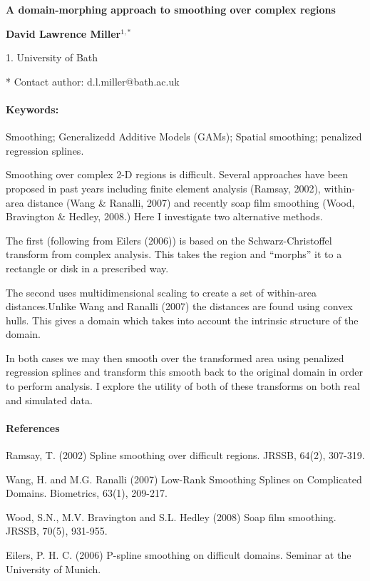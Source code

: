 \documentclass[10pt]{article}
\renewcommand{\title}[1]{\begin{center}{\bf \LARGE #1}\end{center}}
\newcommand{\keywords}{\paragraph{Keywords:}}
\begin{document}
\pagestyle{empty}

\title{A domain-morphing approach to smoothing over complex regions}

\begin{center}
  {\bf David Lawrence Miller$^{1,*}$}
\end{center}

\begin{affiliations}
1. University of Bath\par
* Contact author: d.l.miller@bath.ac.uk
\end{affiliations}

\keywords Smoothing; Generalizedd Additive Models (GAMs); Spatial smoothing; penalized regression splines.

\vskip 0.8cm

Smoothing over complex 2-D regions is difficult. Several approaches have been proposed in past years including finite element analysis (Ramsay, 2002), within-area distance (Wang \& Ranalli, 2007) and recently soap film smoothing (Wood, Bravington \& Hedley, 2008.) Here I investigate two alternative methods.

The first (following from Eilers (2006)) is based on the Schwarz-Christoffel transform from complex analysis. This takes the region and ``morphs'' it to a rectangle or disk in a prescribed way. 

The second uses multidimensional scaling to create a set of within-area distances.Unlike Wang and Ranalli (2007) the distances are found using convex hulls. This gives a domain which takes into account the intrinsic structure of the domain.

In both cases we may then smooth over the transformed area using penalized regression splines and transform this smooth back to the original domain in order to perform analysis. I explore the utility of both of these transforms on both real and simulated data.

\paragraph{References}
\begin{description}
\item Ramsay, T. (2002) Spline smoothing over difficult regions. JRSSB, 64(2), 307-319.
\item Wang, H. and M.G. Ranalli (2007) Low-Rank Smoothing Splines on Complicated Domains. Biometrics, 63(1), 209-217.
\item Wood, S.N., M.V. Bravington and S.L. Hedley (2008) Soap film smoothing. JRSSB, 70(5), 931-955.
\item Eilers, P. H. C. (2006) P-spline smoothing on difficult domains. Seminar at the University of Munich.

\end{description}

%
%
\end{document}
